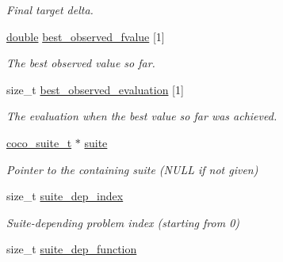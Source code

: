 \begin{DoxyCompactItemize}
\begin{DoxyCompactList}\small\item\em Final target delta. \end{DoxyCompactList}\item 
\hyperlink{classdouble}{double} \hyperlink{structcoco__problem__s_a60d58e8f5444b3743b31f04e3d46431f}{best\+\_\+observed\+\_\+fvalue} \mbox{[}1\mbox{]}\hypertarget{structcoco__problem__s_a60d58e8f5444b3743b31f04e3d46431f}{}\label{structcoco__problem__s_a60d58e8f5444b3743b31f04e3d46431f}

\begin{DoxyCompactList}\small\item\em The best observed value so far. \end{DoxyCompactList}\item 
size\+\_\+t \hyperlink{structcoco__problem__s_a4246b14180d4cb41a13a601d7a140406}{best\+\_\+observed\+\_\+evaluation} \mbox{[}1\mbox{]}\hypertarget{structcoco__problem__s_a4246b14180d4cb41a13a601d7a140406}{}\label{structcoco__problem__s_a4246b14180d4cb41a13a601d7a140406}

\begin{DoxyCompactList}\small\item\em The evaluation when the best value so far was achieved. \end{DoxyCompactList}\item 
\hyperlink{structcoco__suite__s}{coco\+\_\+suite\+\_\+t} $\ast$ \hyperlink{structcoco__problem__s_a550de4fd935ef65a5f2aaad1d52280da}{suite}\hypertarget{structcoco__problem__s_a550de4fd935ef65a5f2aaad1d52280da}{}\label{structcoco__problem__s_a550de4fd935ef65a5f2aaad1d52280da}

\begin{DoxyCompactList}\small\item\em Pointer to the containing suite (N\+U\+LL if not given) \end{DoxyCompactList}\item 
size\+\_\+t \hyperlink{structcoco__problem__s_a2961623a246424a540995405e56643ff}{suite\+\_\+dep\+\_\+index}\hypertarget{structcoco__problem__s_a2961623a246424a540995405e56643ff}{}\label{structcoco__problem__s_a2961623a246424a540995405e56643ff}

\begin{DoxyCompactList}\small\item\em Suite-\/depending problem index (starting from 0) \end{DoxyCompactList}\item 
size\+\_\+t \hyperlink{structcoco__problem__s_a5c1ff17893542d5e20b9235b6a6b638e}{suite\+\_\+dep\+\_\+function}\hypertarget{structcoco__problem__s_a5c1ff17893542d5e20b9235b6a6b638e}{}\label{structcoco__problem__s_a5c1ff17893542d5e20b9235b6a6b638e}


\end{DoxyCompactItemize}

